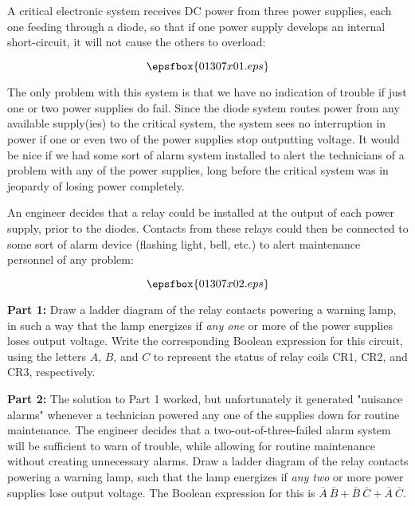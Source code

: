 

A critical electronic system receives DC power from three power supplies, each one feeding through a diode, so that if one power supply develops an internal short-circuit, it will not cause the others to overload:

$$\epsfbox{01307x01.eps}$$

The only problem with this system is that we have no indication of trouble if just one or two power supplies do fail.  Since the diode system routes power from any available supply(ies) to the critical system, the system sees no interruption in power if one or even two of the power supplies stop outputting voltage.  It would be nice if we had some sort of alarm system installed to alert the technicians of a problem with any of the power supplies, long before the critical system was in jeopardy of losing power completely.

An engineer decides that a relay could be installed at the output of each power supply, prior to the diodes.  Contacts from these relays could then be connected to some sort of alarm device (flashing light, bell, etc.) to alert maintenance personnel of any problem:

$$\epsfbox{01307x02.eps}$$

{\bf Part 1:} Draw a ladder diagram of the relay contacts powering a warning lamp, in such a way that the lamp energizes if {\it any one} or more of the power supplies loses output voltage.  Write the corresponding Boolean expression for this circuit, using the letters $A$, $B$, and $C$ to represent the status of relay coils CR1, CR2, and CR3, respectively.

\vskip 10pt

{\bf Part 2:} The solution to Part 1 worked, but unfortunately it generated "nuisance alarms" whenever a technician powered any one of the supplies down for routine maintenance.  The engineer decides that a two-out-of-three-failed alarm system will be sufficient to warn of trouble, while allowing for routine maintenance without creating unnecessary alarms.  Draw a ladder diagram of the relay contacts powering a warning lamp, such that the lamp energizes if {\it any two} or more power supplies lose output voltage.  The Boolean expression for this is $\overline{A} \> \overline{B} + \overline{B} \> \overline{C} + \overline{A} \> \overline{C}$.

